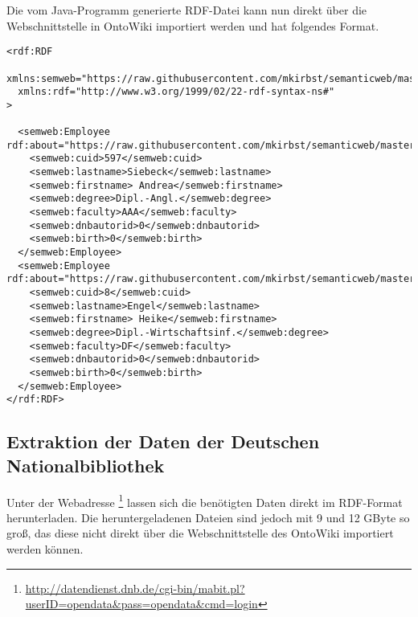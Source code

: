 \documentclass[parskip]{scrartcl}
\begin{document}
Die vom Java-Programm generierte RDF-Datei kann nun direkt über die Webschnittstelle in OntoWiki importiert werden und hat folgendes Format.
\begin{lstlisting}[captionpos=b, caption=RDF-Format der exportierten HTWK-Mitarbeiterdaten, label=RDF-Format der exportierten HTWK-Mitarbeiterdaten]
<rdf:RDF
  xmlns:semweb="https://raw.githubusercontent.com/mkirbst/semanticweb/master/scheme#"
  xmlns:rdf="http://www.w3.org/1999/02/22-rdf-syntax-ns#"
>

  <semweb:Employee rdf:about="https://raw.githubusercontent.com/mkirbst/semanticweb/master/htwkstaff.json#cuid597">
    <semweb:cuid>597</semweb:cuid>
    <semweb:lastname>Siebeck</semweb:lastname>
    <semweb:firstname> Andrea</semweb:firstname>
    <semweb:degree>Dipl.-Angl.</semweb:degree>
    <semweb:faculty>AAA</semweb:faculty>
    <semweb:dnbautorid>0</semweb:dnbautorid>
    <semweb:birth>0</semweb:birth>
  </semweb:Employee>
  <semweb:Employee rdf:about="https://raw.githubusercontent.com/mkirbst/semanticweb/master/htwkstaff.json#cuid8">
    <semweb:cuid>8</semweb:cuid>
    <semweb:lastname>Engel</semweb:lastname>
    <semweb:firstname> Heike</semweb:firstname>
    <semweb:degree>Dipl.-Wirtschaftsinf.</semweb:degree>
    <semweb:faculty>DF</semweb:faculty>
    <semweb:dnbautorid>0</semweb:dnbautorid>
    <semweb:birth>0</semweb:birth>
  </semweb:Employee>
</rdf:RDF>
\end{lstlisting}

\subsection{Extraktion der Daten der Deutschen Nationalbibliothek}
Unter der Webadresse \footnote{\url{http://datendienst.dnb.de/cgi-bin/mabit.pl?userID=opendata&pass=opendata&cmd=login}} lassen sich die benötigten Daten direkt im RDF-Format herunterladen. Die heruntergeladenen Dateien sind jedoch mit 9 und 12 GByte so groß,
das diese nicht direkt über die Webschnittstelle des OntoWiki importiert werden können. 
\end{document}
